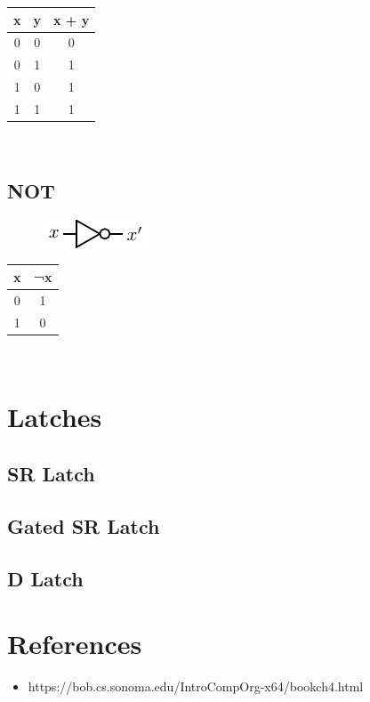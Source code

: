 \begin{tabular}{c c c}
	\hline
	\textbf{x} & \textbf{y} & \textbf{x + y} \\ 
	\hline
	0 & 0 & 0 \\
	0 & 1 & 1 \\
	1 & 0 & 1 \\
	1 & 1 & 1 \\
	\hline 
\end{tabular} \\

\subsection{NOT}

\begin{figure}[h!]
	\includegraphics{./img/not.png}
\end{figure}


\begin{tabular}{c c}
	\hline
	\textbf{x} & \textbf{¬x} \\ 
	\hline
	0 & 1  \\
	1 & 0  \\
	\hline 
\end{tabular} \\

\section{Latches}

\subsection{SR Latch}

\subsection{Gated SR Latch}

\subsection{D Latch}

\section{References}

\begin{itemize}
	\item https://bob.cs.sonoma.edu/IntroCompOrg-x64/bookch4.html
\end{itemize}